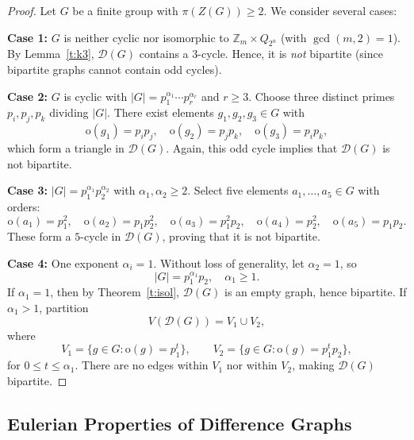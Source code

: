 \documentclass[12pt]{amsart}
\theoremstyle{plain}
\theoremstyle{remark}
\theoremstyle{definition}
\begin{document}
\begin{proof}
Let \(G\) be a finite group with \(\pi(Z(G)) \ge 2\). We consider several cases:

\noindent\textbf{Case 1:} \(G\) is neither cyclic nor isomorphic to \(\mathbb{Z}_m \times Q_{2^n}\) (with \(\gcd(m, 2)=1\)).  
By Lemma~\ref{t:k3}, \(\mathcal{D}(G)\) contains a 3-cycle. Hence, it is \emph{not} bipartite (since bipartite graphs cannot contain odd cycles).


\noindent\textbf{Case 2:} \(G\) is cyclic with \(\lvert G \rvert = p_1^{\alpha_1} \cdots p_r^{\alpha_r}\) and \(r \ge 3\).  
Choose three distinct primes \(p_i, p_j, p_k\) dividing \(\lvert G \rvert\). There exist elements \(g_1, g_2, g_3 \in G\) with
\[
\mathrm{o}(g_1) = p_i p_j,\quad
\mathrm{o}(g_2) = p_j p_k,\quad
\mathrm{o}(g_3) = p_i p_k,
\]
which form a triangle in \(\mathcal{D}(G)\). Again, this odd cycle implies that \(\mathcal{D}(G)\) is not bipartite.


\noindent\textbf{Case 3:} \(\lvert G \rvert = p_1^{\alpha_1} p_2^{\alpha_2}\) with \(\alpha_1, \alpha_2 \ge 2\).  
Select five elements \(a_1, \dots, a_5 \in G\) with orders:
\[
\mathrm{o}(a_1) = p_1^2,\quad
\mathrm{o}(a_2) = p_1 p_2^2,\quad
\mathrm{o}(a_3) = p_1^2 p_2,\quad
\mathrm{o}(a_4) = p_2^2,\quad
\mathrm{o}(a_5) = p_1 p_2.
\]
These form a $5$-cycle in \(\mathcal{D}(G)\), proving that it is not bipartite.

\noindent\textbf{Case 4:} One exponent \(\alpha_i = 1\). Without loss of generality, let \(\alpha_2 = 1\), so
\[
\lvert G \rvert = p_1^{\alpha_1} p_2, \quad \alpha_1 \ge 1.
\]
If \(\alpha_1 = 1\), then by Theorem~\ref{t:isol}, \(\mathcal{D}(G)\) is an empty graph, hence bipartite.
If \(\alpha_1 > 1\), partition
\[
V(\mathcal{D}(G)) = V_1 \cup V_2,
\]
where
\[
V_1 = \{g \in G : \mathrm{o}(g) = p_1^t\},\qquad
V_2 = \{g \in G : \mathrm{o}(g) = p_1^t p_2\},
\]
for \(0 \le t \le \alpha_1\). There are no edges within \(V_1\) nor within \(V_2\), making \(\mathcal{D}(G)\) bipartite. 
\end{proof}





\subsection{Eulerian Properties of Difference Graphs}
\end{document}
